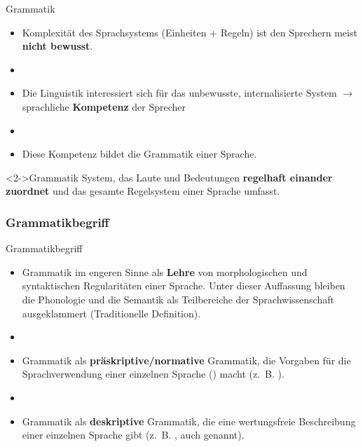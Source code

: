\begin{frame}{Grammatik}
	\begin{itemize}
		\item Komplexität des Sprachsystems (Einheiten + Regeln) ist den Sprechern meist \textbf{nicht bewusst}.
		\item[]
		\item Die Linguistik interessiert sich für das unbewusste, internalisierte System $\rightarrow$ sprachliche \textbf{Kompetenz} der Sprecher
		\item[]
		\item Diese Kompetenz bildet die Grammatik einer Sprache.
	\end{itemize}
	
	\begin{block}<2->{Grammatik}
		System, das Laute und Bedeutungen \textbf{regelhaft einander zuordnet} und das gesamte Regelsystem einer Sprache umfasst.
	\end{block}	
\end{frame}


%	
\subsubsection{Grammatikbegriff}

\begin{frame}{Grammatikbegriff}

\begin{itemize}
	\item<1-> Grammatik im engeren Sinne als \textbf{Lehre} von morphologischen und syntaktischen Regularitäten einer Sprache. Unter dieser Auffassung bleiben die Phonologie und die Semantik als Teilbereiche der Sprachwissenschaft ausgeklammert (Traditionelle Definition).
	\item[]
	\item<2-> Grammatik als \textbf{präskriptive/normative} Grammatik, die Vorgaben für die  Sprachverwendung einer einzelnen Sprache () macht (z.~B. \citet{DudenGramm09d}).
	\item[]
	\item<3-> Grammatik als \textbf{deskriptive} Grammatik, die eine wertungsfreie Beschreibung einer einzelnen Sprache gibt (z.~B. \citet{Eisenberg00a}, auch  genannt).
\end{itemize}

\end{frame}


